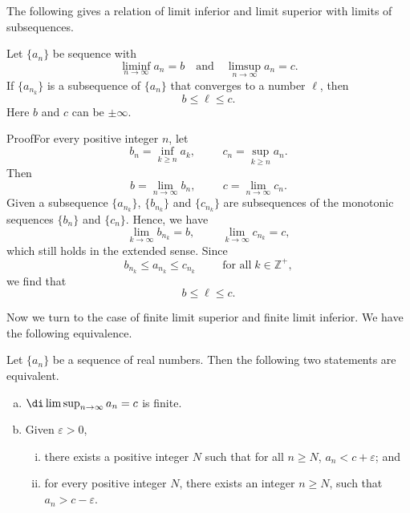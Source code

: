 The following gives a relation of limit inferior and limit superior with limits of subsequences.
\begin{theorem}[label=230226_8]{}
Let $\{a_n\}$ be sequence with \[ \liminf_{n\to\infty}a_n=b\quad \text{and}\quad \limsup_{n\to\infty}a_n=c.\] If $\{a_{n_k}\}$ is a subsequence of $\{a_n\}$ that converges to a number $\ell$, then
\[b\leq \ell \leq c.\] Here $b$ and $c$ can be $\pm\infty$.
\end{theorem}
\begin{myproof}{Proof}For every positive integer $n$, let 
\[b_n=\inf_{k\geq n}a_k,\hspace{1cm}c_n=\sup_{k\geq n}a_n.\]
Then
\[b=\lim_{n\to\infty}b_n,\hspace{1cm}c =\lim_{n\to\infty} c_n.\]Given a subsequence $\{a_{n_k}\}$, 
$\{b_{n_k}\}$ and $\{c_{n_k}\}$ are subsequences of the monotonic sequences $\{b_n\}$ and $\{c_n\}$. Hence, we  have
\[\lim_{k\to\infty}b_{n_k}=b,\hspace{1cm}\lim_{k\to\infty}c_{n_k}=c,\]which still holds in the extended sense.
Since \[b_{n_k}\leq a_{n_k}\leq c_{n_k}\hspace{1cm}\text{for all}\;k\in\mathbb{Z}^+,\]we find that
\[b\leq\ell\leq c.\]
\end{myproof}

Now we turn to the case of finite limit superior and finite limit inferior.
We have the following equivalence.
\begin{theorem}[label=230226_5]{}
Let $\{a_n\}$ be a sequence of real numbers. Then  the following two statements are equivalent.
\begin{enumerate}[(a)]
\item $\di\limsup_{n\to\infty}a_n=c$ is finite.
\item Given $\varepsilon>0$, \begin{enumerate}[(i)]\item
there exists a positive integer $N$ such that for all $n\geq N$, $a_n<c+\varepsilon$; and 
\item for every 
  positive integer $N$, there exists an integer $n\geq N$, such that $a_n>c-\varepsilon$.
 \end{enumerate}\end{enumerate}
\end{theorem}

